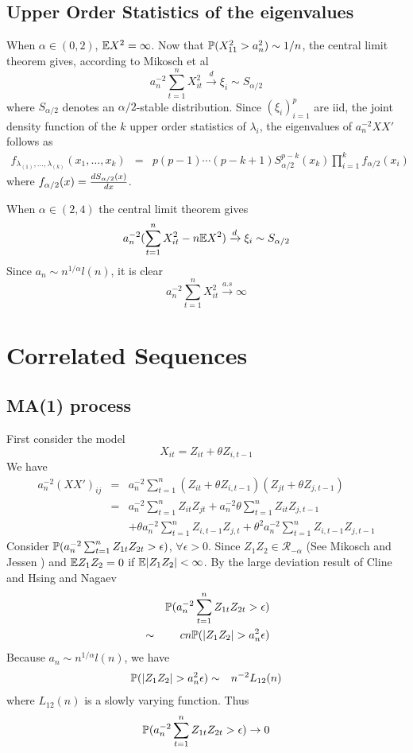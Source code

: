 \documentclass{article}
\begin{document}
\subsection{Upper Order Statistics of the eigenvalues}
When $\alpha \in (0,2)$, $\mathbb{E} X^2 = \infty$. Now that
$\mathbb{P}(X_{11}^2 > a_n^2) \sim 1/n$, the central limit theorem 
gives, according to Mikosch et al\cite{Embrechts1997} 
\[
a_n^{-2} \sum_{t=1}^n X_{it}^2 \xrightarrow{d} \xi_i \sim S_{\alpha/2}
\]
where $S_{\alpha/2}$ denotes an $\alpha/2$-stable distribution.
Since $(\xi_i)_{i=1}^p$ are iid, the joint density function of the $k$
upper order statistics of $\lambda_i$, the eigenvalues of $a_n^{-2} X X'$
follows as
\begin{eqnarray*}
  f_{\lambda_{(1)}, \dots, \lambda_{(k)}}(x_1, \dots, x_k) &=&
  p(p-1)\cdots(p-k+1) S_{\alpha/2}^{p-k}(x_k) \prod_{i=1}^k
  f_{\alpha/2}(x_i)
\end{eqnarray*}
where $f_{\alpha/2}(x) = {d S_{\alpha/2}(x) \over dx}$.

When $\alpha \in (2,4)$ the central limit theorem gives
\[
a_n^{-2} (\sum_{t=1}^n X_{it}^2 - n \mathbb{E} X^2)\xrightarrow{d}
\xi_i \sim S_{\alpha/2}
\]
Since $a_n \sim n^{1/\alpha} l(n)$, it is clear
\[
a_n^{-2} \sum_{t=1}^n X_{it}^2 \xrightarrow{a.s}\infty
\]

\section{Correlated Sequences}
\subsection{MA(1) process}
First consider the model
\[
X_{it} = Z_{it} + \theta Z_{i,t-1}
\]
We have
\begin{eqnarray*}
  a_n^{-2}(XX')_{ij} &=& a_n^{-2} \sum_{t=1}^n (Z_{it} + \theta
  Z_{i,t-1}) (Z_{jt} + \theta Z_{j,t-1}) \\
  &=& a_n^{-2} \sum_{t=1}^n Z_{it} Z_{jt} + a_n^{-2} \theta \sum_{t=1}^n
  Z_{it} Z_{j,t-1} \\
  && +\theta a_n^{-2} \sum_{t=1}^n Z_{i, t-1}
  Z_{j,t} + \theta^2 a_n^{-2} \sum_{t=1}^n Z_{i,t-1} Z_{j,t-1}
\end{eqnarray*}
Consider $\mathbb{P}(a_n^{-2} \sum_{t=1}^n Z_{1t} Z_{2t} > \epsilon)$,
$\forall \epsilon>0$. Since $Z_1 Z_2 \in \mathcal R_{-\alpha}$ (See
Mikosch and Jessen \cite{JessenMikosch2006}) and $\mathbb{E} Z_1 Z_2 = 0$ if
$\mathbb{E}|Z_1Z_2| < \infty$. By the large deviation result of Cline and
Hsing \cite{ClingHsing1998} and Nagaev \cite{nagaev1979}
\begin{eqnarray*}
  && \mathbb{P}(a_n^{-2} \sum_{t=1}^n Z_{1t} Z_{2t} > \epsilon)  \\
  &\sim& c n \mathbb{P}(|Z_1 Z_2| > a_n^{2} \epsilon)  \\
\end{eqnarray*}
Because $a_n \sim n^{1/\alpha} l(n)$, we have
\begin{eqnarray*}
  \mathbb{P}(|Z_1 Z_2| > a_n^{2} \epsilon) &\sim& n^{-2} L_{12}(n)
\end{eqnarray*}
where $L_{12}(n)$ is a slowly varying function. Thus
\[
\mathbb{P}(a_n^{-2} \sum_{t=1}^n Z_{1t} Z_{2t} > \epsilon) \to 0
\]
\end{document}
